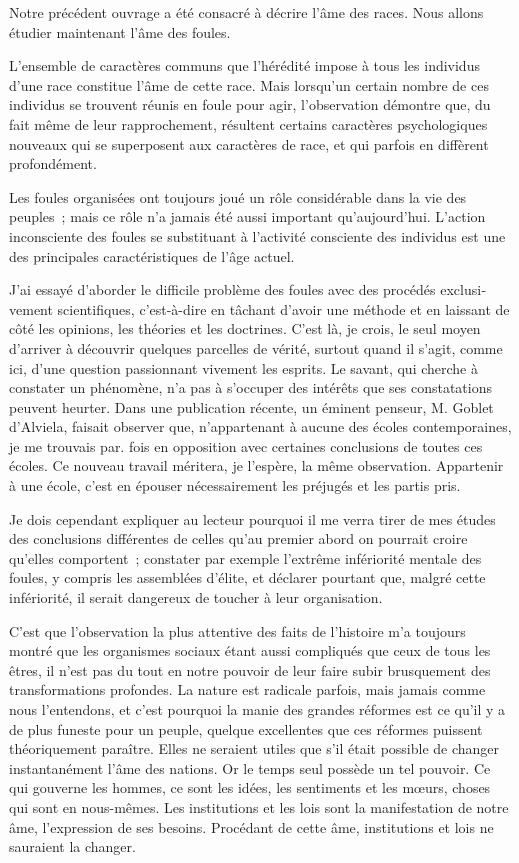 \documentclass[french,twoside]{book} %
\begin{document}
\noindent Notre précédent ouvrage a été consacré à décrire l’âme des races. Nous allons étudier maintenant l’âme des foules.\par
L’ensemble de caractères communs que l’hérédité impose à tous les individus d’une race constitue l’âme de cette race. Mais lorsqu’un certain nombre de ces indi­vidus se trouvent réunis en foule pour agir, l’observation démontre que, du fait même de leur rapprochement, résultent certains caractères psychologiques nouveaux qui se superposent aux caractères de race, et qui parfois en diffèrent profondément.\par
Les foules organisées ont toujours joué un rôle considérable dans la vie des peuples ; mais ce rôle n’a jamais été aussi important qu’aujourd’hui. L’action incon­sciente des foules se substituant à l’activité consciente des individus est une des principales caractéristiques de l’âge actuel.\par
J’ai essayé d’aborder le difficile problème des foules avec des procédés exclusi­vement scientifiques, c’est-à-dire en tâchant d’avoir une méthode et en laissant de côté les opinions, les théories et les doctrines. C’est là, je crois, le seul moyen d’arriver à découvrir quelques parcelles de vérité, surtout quand il s’agit, comme ici, d’une question passionnant vivement les esprits. Le savant, qui cherche à constater un phé­nomène, n’a pas à s’occuper des intérêts que ses constatations peuvent heurter. Dans une publication récente, un éminent penseur, M. Goblet d’Alviela, faisait observer que, n’appartenant à aucune des écoles contemporaines, je me trouvais par. fois en opposition avec certaines conclusions de toutes ces écoles. Ce nouveau travail méritera, je l’espère, la même observation. Appartenir à une école, c’est en épouser nécessairement les préjugés et les partis pris.\par
Je dois cependant expliquer au lecteur pourquoi il me verra tirer de mes études des conclusions différentes de celles qu’au premier abord on pourrait croire qu’elles comportent ; constater par exemple l’extrême infériorité mentale des foules, y compris les assemblées d’élite, et déclarer pourtant que, malgré cette infériorité, il serait dangereux de toucher à leur organisation.\par
C’est que l’observation la plus attentive des faits de l’histoire m’a toujours montré que les organismes sociaux étant aussi compliqués que ceux de tous les êtres, il n’est pas du tout en notre pouvoir de leur faire subir brusquement des transformations profondes. La nature est radicale parfois, mais jamais comme nous l’entendons, et c’est pourquoi la manie des grandes réformes est ce qu’il y a de plus funeste pour un peuple, quelque excellentes que ces réformes puissent théoriquement paraître. Elles ne seraient utiles que s’il était possible de changer instantanément l’âme des nations. Or le temps seul possède un tel pouvoir. Ce qui gouverne les hommes, ce sont les idées, les sentiments et les mœurs, choses qui sont en nous-mêmes. Les institutions et les lois sont la manifestation de notre âme, l’expression de ses besoins. Procédant de cette âme, institutions et lois ne sauraient la changer.\par
\end{document}

